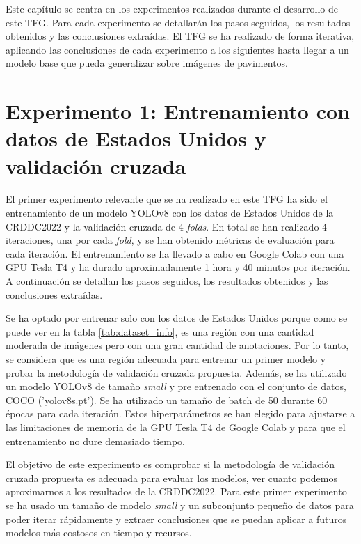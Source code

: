 
Este capítulo se centra en los experimentos realizados durante el desarrollo de este TFG. Para cada experimento se detallarán los pasos seguidos, los resultados obtenidos y las conclusiones extraídas. El TFG se ha realizado de forma iterativa, aplicando las conclusiones de cada experimento a los siguientes hasta llegar a un modelo base que pueda generalizar sobre imágenes de pavimentos.


\section{Experimento 1: Entrenamiento con datos de Estados Unidos y validación cruzada}\label{SEC:EXP1}

El primer experimento relevante que se ha realizado en este TFG ha sido el entrenamiento de un modelo YOLOv8 con los datos de Estados Unidos de la CRDDC2022 y la validación cruzada de 4 \textit{folds}. En total se han realizado 4 iteraciones, una por cada \textit{fold}, y se han obtenido métricas de evaluación para cada iteración. El entrenamiento se ha llevado a cabo en Google Colab con una GPU Tesla T4 y ha durado aproximadamente 1 hora y 40 minutos por iteración. A continuación se detallan los pasos seguidos, los resultados obtenidos y las conclusiones extraídas.

Se ha optado por entrenar solo con los datos de Estados Unidos porque como se puede ver en la tabla \ref{tab:dataset_info}, es una región con una cantidad moderada de imágenes pero con una gran cantidad de anotaciones. Por lo tanto, se considera que es una región adecuada para entrenar un primer modelo y probar la metodología de validación cruzada propuesta. Además, se ha utilizado un modelo YOLOv8 de tamaño \textit{small} y pre entrenado con el conjunto de datos, COCO ('yolov8s.pt'). Se ha utilizado un tamaño de batch de 50 durante 60 épocas para cada iteración. Estos hiperparámetros se han elegido para ajustarse a las limitaciones de memoria de la GPU Tesla T4 de Google Colab y para que el entrenamiento no dure demasiado tiempo.

El objetivo de este experimento es comprobar si la metodología de validación cruzada propuesta es adecuada para evaluar los modelos, ver cuanto podemos aproximarnos a los resultados de la CRDDC2022. Para este primer experimento se ha usado un tamaño de modelo \textit{small} y un subconjunto pequeño de datos para poder iterar rápidamente y extraer conclusiones que se puedan aplicar a futuros modelos más costosos en tiempo y recursos.

